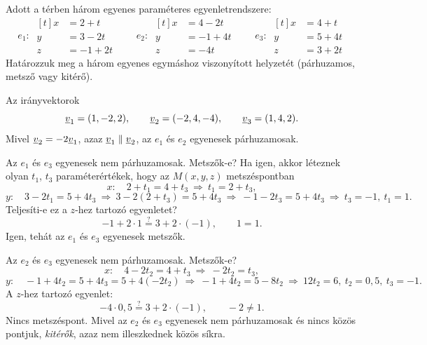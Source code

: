 \documentclass[11pt]{article}
\begin{document}
\begin{exbox}
\begin{example}
Adott a térben három egyenes paraméteres egyenletrendszere:
\[
e_{1}:\ \begin{aligned}[t] x&=2+t\\ y&=3-2t\\ z&=-1+2t \end{aligned}
\qquad
e_{2}:\ \begin{aligned}[t] x&=4-2t\\ y&=-1+4t\\ z&=-4t \end{aligned}
\qquad
e_{3}:\ \begin{aligned}[t] x&=4+t\\ y&=5+4t\\ z&=3+2t \end{aligned}
\]
Határozzuk meg a három egyenes egymáshoz viszonyított helyzetét (párhuzamos, metsző vagy kitérő).
\end{example}
\end{exbox}
\begin{solution}
Az irányvektorok
\[
\underline{v}_{1}=(1, -2, 2),\qquad \underline{v}_{2}=(-2, 4, -4),\qquad \underline{v}_{3}=(1, 4, 2).
\]
Mivel $\underline{v}_{2}=-2\underline{v}_{1}$, azaz $\underline{v}_{1}\parallel\underline{v}_{2}$, az $e_{1}$ és $e_{2}$ egyenesek párhuzamosak.

Az $e_{1}$ és $e_{3}$ egyenesek nem párhuzamosak. Metszők-e? Ha igen, akkor léteznek olyan $t_{1}$, $t_{3}$ paraméterértékek, hogy az $M(x, y, z)$ metszéspontban
\[
x:\quad 2+t_{1}=4+t_{3}\ \Longrightarrow\ t_{1}=2+t_{3},
\]
\[
y:\quad 3-2t_{1}=5+4t_{3}\ \Longrightarrow\ 3-2(2+t_{3})=5+4t_{3}
\ \Longrightarrow\ -1-2t_{3}=5+4t_{3}\ \Longrightarrow\ t_{3}=-1,\ t_{1}=1 .
\]
Teljesíti-e ez a $z$-hez tartozó egyenletet?
\[
-1+2\cdot 1\overset{?}{=}3+2\cdot(-1),\qquad 1=1 .
\]
Igen, tehát az $e_{1}$ és $e_{3}$ egyenesek metszők.

Az $e_{2}$ és $e_{3}$ egyenesek nem párhuzamosak. Metszők-e?
\[
x:\quad 4-2t_{2}=4+t_{3}\ \Longrightarrow\ -2t_{2}=t_{3},
\]
\[
y:\quad -1+4t_{2}=5+4t_{3}=5+4(-2t_{2})\ \Longrightarrow\ -1+4t_{2}=5-8t_{2}
\ \Longrightarrow\ 12t_{2}=6,\ t_{2}=0,5,\ t_{3}=-1 .
\]
A $z$-hez tartozó egyenlet:
\[
-4\cdot 0,5\overset{?}{=}3+2\cdot(-1),\qquad -2\neq 1 .
\]
Nincs metszéspont. Mivel az $e_{2}$ és $e_{3}$ egyenesek nem párhuzamosak és nincs közös pontjuk, \emph{kitérők}, azaz nem illeszkednek közös síkra.
\end{solution}

\end{document}
